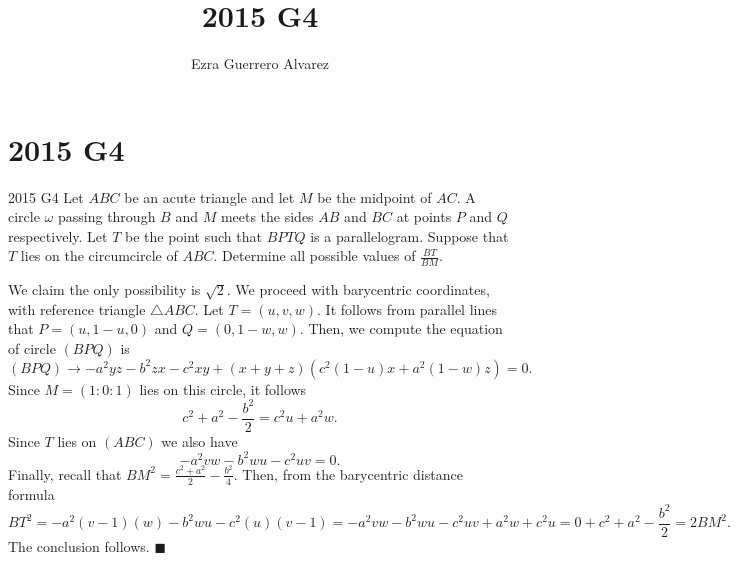 \documentclass[14pt]{article}
\title{2015 G4}
\author{Ezra Guerrero Alvarez}
\begin{document}
\maketitle
	
\section*{2015 G4}

\begin{statement}{2015 G4}
	Let $ABC$ be an acute triangle and let $M$ be the midpoint of $AC$. A circle $\omega$ passing through $B$ and $M$ meets the sides $AB$ and $BC$ at points $P$ and $Q$ respectively. Let $T$ be the point such that $BPTQ$ is a parallelogram. Suppose that $T$ lies on the circumcircle of $ABC$. Determine all possible values of $\frac{BT}{BM}$.
\end{statement}
We claim the only possibility is $\sqrt2$. We proceed with barycentric coordinates, with reference triangle $\triangle ABC$. Let $T=(u,v,w)$. It follows from parallel lines that $P=(u,1-u,0)$ and $Q=(0,1-w,w)$. Then, we compute the equation of circle $(BPQ)$ is
\[ (BPQ)\to -a^2yz-b^2zx-c^2xy+(x+y+z)(c^2(1-u)x+a^2(1-w)z)=0. \]
Since $M=(1:0:1)$ lies on this circle, it follows 
\[ c^2+a^2-\frac{b^2}2=c^2u+a^2w. \]
Since $T$ lies on $(ABC)$ we also have
\[ -a^2vw-b^2wu-c^2uv=0. \]
Finally, recall that $BM^2=\frac{c^2+a^2}2-\frac{b^2}4$. Then, from the barycentric distance formula
\[ BT^2=-a^2(v-1)(w)-b^2wu-c^2(u)(v-1)=-a^2vw-b^2wu-c^2uv+a^2w+c^2u=0+c^2+a^2-\frac{b^2}2=2BM^2. \]
The conclusion follows. $\blacksquare$
	
\end{document}
